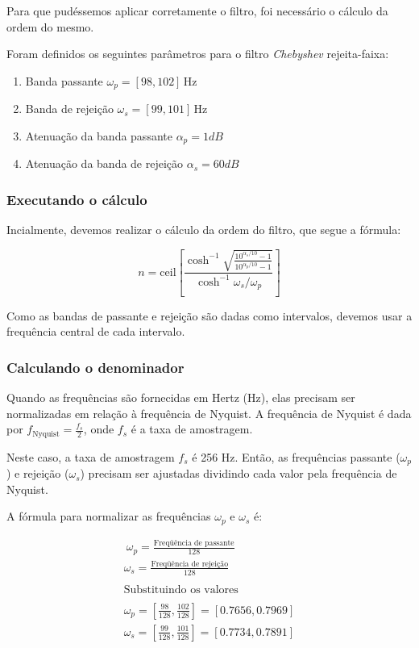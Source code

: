 Para que pudéssemos aplicar corretamente o filtro, foi necessário o cálculo da ordem do mesmo.

Foram definidos os seguintes parâmetros para o filtro \textit{Chebyshev} rejeita-faixa:

\begin{enumerate}
    \item Banda passante $\omega_p= [98, 102] \, \text{Hz}$
    \item Banda de rejeição $\omega_s = [99, 101]\, \text{Hz}$
    \item Atenuação da banda passante $\alpha_p = 1dB$
    \item Atenuação da banda de rejeição $\alpha_s = 60dB$
\end{enumerate}


\subsubsection*{Executando o cálculo}
Incialmente, devemos realizar o cálculo da ordem do filtro, que segue a fórmula:

$$
    n = \text{ceil} \left[ \frac{\cosh^{-1}{\sqrt{\frac{10^{\alpha_s/10}- 1}{10^{\alpha_p/10}-1}}}}{\cosh^{-1}{\omega_s/\omega_p}} \right]
$$


Como as bandas de passante e rejeição são dadas como intervalos, devemos usar a frequência central de cada intervalo.

\subsubsection*{Calculando o denominador}

Quando as frequências são fornecidas em Hertz (Hz), elas precisam ser normalizadas em relação à frequência de Nyquist. A frequência de Nyquist é dada por $f_{\text{Nyquist}} = \frac{f_s}{2}$, onde $f_s$ é a taxa de amostragem.

Neste caso, a taxa de amostragem $f_s$ é 256 Hz. Então, as frequências passante ($\omega_p$) e rejeição ($\omega_s$) precisam ser ajustadas dividindo cada valor pela frequência de Nyquist.

A fórmula para normalizar as frequências $\omega_p$ e $\omega_s$ é:

\begin{align*} \
    \omega_p = \frac{\text{Freqüência de passante}}{128}                       \\
    \omega_s = \frac{\text{Freqüência de rejeição}}{128}                       \\
    \\
    \text{Substituindo os valores}                                             \\
    \\
    \omega_p = \left[\frac{98}{128}, \frac{102}{128}\right] = [0.7656, 0.7969] \\
    \omega_s = \left[\frac{99}{128}, \frac{101}{128}\right] = [0.7734, 0.7891]
\end{align*}

